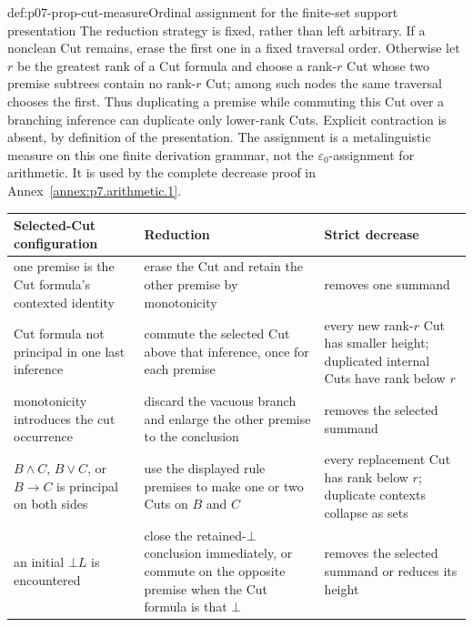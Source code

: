 \begin{hbdefinition}{def:p07-prop-cut-measure}{Ordinal assignment for the finite-set support presentation}
The reduction strategy is fixed, rather than left arbitrary.  If a nonclean
Cut remains, erase the first one in a fixed traversal order.  Otherwise let
\(r\) be the greatest rank of a Cut formula and choose a rank-\(r\) Cut whose
two premise subtrees contain no rank-\(r\) Cut; among such nodes the same
traversal chooses the first.  Thus duplicating a premise while commuting this
Cut over a branching inference can duplicate only lower-rank Cuts.  Explicit
contraction is absent, by definition of the presentation.
The assignment is a metalinguistic measure on this one finite derivation
grammar, not the \(\varepsilon_0\)-assignment for arithmetic.  It is used by
the complete decrease proof in Annex~\ref{annex:p7.arithmetic.1}.
\end{hbdefinition}

\begin{center}
\begin{tabularx}{\textwidth}{@{}l X X@{}}
\toprule
Selected-Cut configuration & Reduction & Strict decrease \\
\midrule
one premise is the Cut formula's contexted identity & erase the Cut and retain the other premise by monotonicity & removes one summand \\
Cut formula not principal in one last inference & commute the selected Cut above that inference, once for each premise & every new rank-\(r\) Cut has smaller height; duplicated internal Cuts have rank below \(r\) \\
monotonicity introduces the cut occurrence & discard the vacuous branch and enlarge the other premise to the conclusion & removes the selected summand \\
\(B\land C\), \(B\lor C\), or \(B\to C\) is principal on both sides & use the displayed rule premises to make one or two Cuts on \(B\) and \(C\) & every replacement Cut has rank below \(r\); duplicate contexts collapse as sets \\
an initial \(\bot L\) is encountered & close the retained-\(\bot\) conclusion immediately, or commute on the opposite premise when the Cut formula is that \(\bot\) & removes the selected summand or reduces its height \\
\bottomrule
\end{tabularx}
\end{center}

